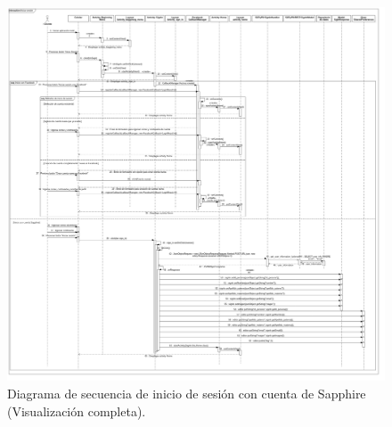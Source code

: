 \begin{figure}[htbp!]
		\centering
			\includegraphics[width=1.1 \textwidth]{imagenes/Diagramas_UserApp/Nuevos_diagramas/inicioSap}
		\caption{Diagrama de secuencia de inicio de sesión con cuenta de Sapphire (Visualización completa).}
		\label{image:inicioSap}
\end{figure}
\FloatBarrier

